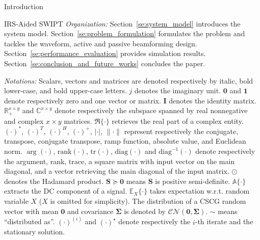 \documentclass[journal]{IEEEtran}
\begin{document}
\begin{section}{Introduction}
\begin{subsection}{IRS-Aided SWIPT}
			\emph{Organization:} Section~\ref{se:system_model} introduces the system model. Section~\ref{se:problem_formulation} formulates the problem and tackles the waveform, active and passive beamforming design. Section~\ref{se:performance_evaluation} provides simulation results. Section~\ref{se:conclusion_and_future_works} concludes the paper.

			\emph{Notations:} Scalars, vectors and matrices are denoted respectively by italic, bold lower-case, and bold upper-case letters. $j$ denotes the imaginary unit. $\boldsymbol{0}$ and $\boldsymbol{1}$ denote respectively zero and one vector or matrix. $\boldsymbol{I}$ denotes the identity matrix. $\mathbb{R}_+^{x \times y}$ and $\mathbb{C}^{x \times y}$ denote respectively the subspace spanned by real nonnegative and complex $x \times y$ matrices. $\Re\{\cdot\}$ retrieves the real part of a complex entity. $(\cdot)^*$, $(\cdot)^T$, $(\cdot)^H$, $(\cdot)^+$, $\lvert{\cdot}\rvert$, $\lVert{\cdot}\rVert$ represent respectively the conjugate, transpose, conjugate transpose, ramp function, absolute value, and Euclidean norm. $\arg(\cdot)$, $\mathrm{rank}(\cdot)$, $\mathrm{tr}(\cdot)$, $\mathrm{diag}(\cdot)$ and $\mathrm{diag}^{-1}(\cdot)$ denote respectively the argument, rank, trace, a square matrix with input vector on the main diagonal, and a vector retrieving the main diagonal of the input matrix. $\odot$ denotes the Hadamard product. $\boldsymbol{S} \succeq \boldsymbol{0}$ means $\boldsymbol{S}$ is positive semi-definite. $\mathbb{A}\{\cdot\}$ extracts the DC component of a signal. $\mathbb{E}_X\{\cdot\}$ takes expectation w.r.t. random variable $X$ ($X$ is omitted for simplicity). The distribution of a CSCG random vector with mean $\boldsymbol{0}$ and covariance $\boldsymbol{\Sigma}$ is denoted by $\mathcal{CN}(\boldsymbol{0},\boldsymbol{\Sigma})$. $\sim$ means ``distributed as''. $(\cdot)^{(i)}$ and $(\cdot)^{\star}$ denote respectively the $i$-th iterate and the stationary solution.
		\end{subsection}
	\end{section}
\end{document}
